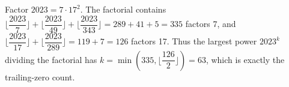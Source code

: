 Factor $2023=7\cdot17^2$. The factorial contains $\lfloor\dfrac{2023}{7}\rfloor+\lfloor\dfrac{2023}{49}\rfloor+\lfloor\dfrac{2023}{343}\rfloor=289+41+5=335$ factors 7, and $\lfloor\dfrac{2023}{17}\rfloor+\lfloor\dfrac{2023}{289}\rfloor=119+7=126$ factors 17. Thus the largest power $2023^k$ dividing the factorial has $k=\min(335,\lfloor\dfrac{126}{2}\rfloor)=\boxed{63}$, which is exactly the trailing-zero count.
